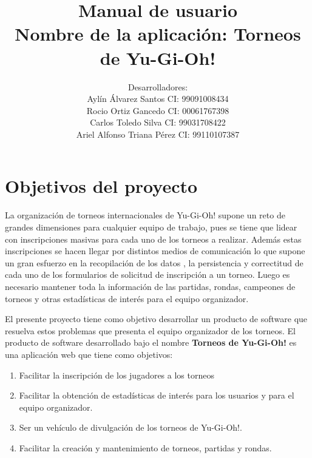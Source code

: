 \documentclass[12pt]{article}
\begin{document}
	\title{\Huge Manual de usuario\\
		Nombre de la aplicaci\'on: Torneos de Yu-Gi-Oh!}
	
	\author{ Desarrolladores:\\
		Ayl\'in \'Alvarez Santos CI: 99091008434\\
		Rocio Ortiz Gancedo CI: 00061767398\\
		Carlos Toledo Silva CI: 99031708422\\
		Ariel Alfonso Triana P\'erez CI: 99110107387
	}
	\date{}
	\maketitle
	
	{\Large\tableofcontents}
	
	\newpage
	
	\section{Objetivos del proyecto}
	
    La organización de torneos internacionales de Yu-Gi-Oh! supone un reto de grandes dimensiones para cualquier equipo de trabajo, pues se tiene que lidear con inscripciones masivas para cada uno de los torneos a realizar. Además estas inscripciones se hacen llegar por distintos medios de comunicación lo que supone un gran esfuerzo en la recopilación de los datos , la persistencia y correctitud de cada uno de los formularios de solicitud de inscripción a un torneo. Luego es necesario mantener toda la información de las partidas, rondas, campeones de   torneos y otras estadísticas de interés para el equipo organizador.

    El presente proyecto tiene como objetivo desarrollar un producto de software que resuelva estos problemas que presenta el equipo organizador de los torneos. El producto de software desarrollado bajo el nombre \textbf{Torneos de Yu-Gi-Oh!} es una aplicación web que tiene como objetivos:
   
    \begin{enumerate}
            \item Facilitar la inscripción de los jugadores a los torneos
            \item Facilitar la obtención de estadísticas de interés para los usuarios y para el equipo organizador.
            \item Ser un vehículo de divulgación de los torneos de Yu-Gi-Oh!.
            \item Facilitar la creación y mantenimiento de torneos, partidas y rondas. 
\end{enumerate}
\end{document}
